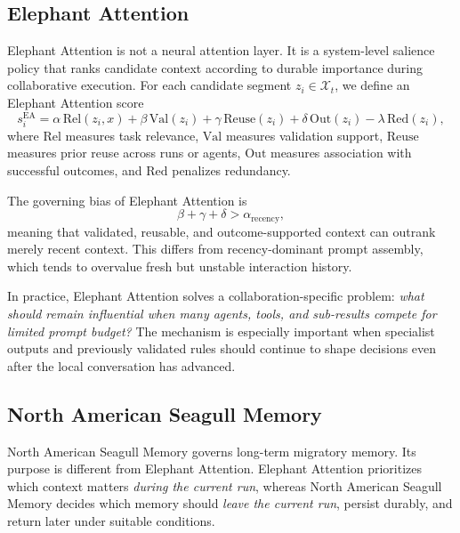 \documentclass[a4paper,fleqn]{cas-sc}
\begin{document}
\subsection{Elephant Attention}

Elephant Attention is not a neural attention layer. It is a system-level salience policy that ranks candidate context according to durable importance during collaborative execution. For each candidate segment $z_i \in \mathcal{X}_t$, we define an Elephant Attention score
\begin{equation}
s_i^{\text{EA}} = \alpha \, \mathrm{Rel}(z_i, x) + \beta \, \mathrm{Val}(z_i) + \gamma \, \mathrm{Reuse}(z_i) + \delta \, \mathrm{Out}(z_i) - \lambda \, \mathrm{Red}(z_i),
\end{equation}
where $\mathrm{Rel}$ measures task relevance, $\mathrm{Val}$ measures validation support, $\mathrm{Reuse}$ measures prior reuse across runs or agents, $\mathrm{Out}$ measures association with successful outcomes, and $\mathrm{Red}$ penalizes redundancy.

The governing bias of Elephant Attention is
\begin{equation}
\beta + \gamma + \delta > \alpha_{\text{recency}},
\end{equation}
meaning that validated, reusable, and outcome-supported context can outrank merely recent context. This differs from recency-dominant prompt assembly, which tends to overvalue fresh but unstable interaction history.

In practice, Elephant Attention solves a collaboration-specific problem: \emph{what should remain influential when many agents, tools, and sub-results compete for limited prompt budget?} The mechanism is especially important when specialist outputs and previously validated rules should continue to shape decisions even after the local conversation has advanced.

\subsection{North American Seagull Memory}

North American Seagull Memory governs long-term migratory memory. Its purpose is different from Elephant Attention. Elephant Attention prioritizes which context matters \emph{during the current run}, whereas North American Seagull Memory decides which memory should \emph{leave the current run}, persist durably, and return later under suitable conditions.
\end{document}
